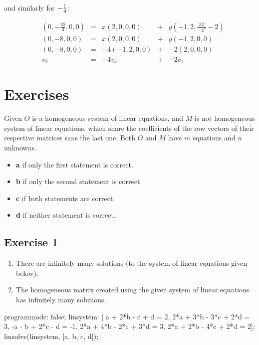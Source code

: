 \documentclass[11pt]{article}
\begin{document}
and similarly for $-{{1}\over{4}}$:

\begin{equation*}
\begin{alignedat}{5}
 & (0, -\frac{32}{4}, 0, 0) &{}={}& x(2, 0, 0, 0)   &{}+{}& y(-1, 2, \frac{32}{-4^2} - 2) \\
 & (0, -8, 0, 0)            &{}={}& x(2, 0, 0, 0)   &{}+{}& y(-1, 2, 0, 0) \\
 & (0, -8, 0, 0)            &{}={}& -4(-1, 2, 0, 0) &{}+{}& -2(2, 0, 0, 0)\\
 & v_2                      &{}={}& -4v_3           &{}+{}& -2v_1
\end{alignedat}
\end{equation*}
\section{Exercises}
\label{sec-2}
Given $O$ is a homogeneous system of linear equations, and $M$ is not
homogeneous system of linear equations, which share the coefficients of the
row vectors of their respective matrices sans the last one.  Both $O$ and $M$
have $m$ equations and $n$ unknowns.

\begin{itemize}
\item \textbf{a} if only the first statement is correct.
\item \textbf{b} if only the second statement is correct.
\item \textbf{c} if both statements are correct.
\item \textbf{d} if neither statement is correct.
\end{itemize}

\subsection{Exercise 1}
\label{sec-2-1}

\begin{enumerate}
\item There are infinitely many solutions (to the system of linear equations
given below).
\item The homogeneous matrix created using the given system of linear equations
has infinitely many solutions.
\end{enumerate}

\begin{maxima}
programmode: false;
linsystem: [  a + 2*b -   c +   d = 2,
            2*a + 3*b - 3*c + 2*d = 3,
             -a -   b + 2*c -   d = -1,
            2*a + 4*b - 2*c + 3*d = 3,
            2*a + 2*b - 4*c + 2*d = 2];
linsolve(linsystem, [a, b, c, d]);
\end{maxima}
\end{document}
